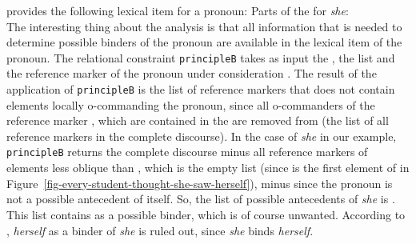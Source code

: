 \documentclass[output=paper
 	        ,biblatex
                ,babelshorthands
                ,newtxmath
                ,draftmode
                ,colorlinks, citecolor=brown
]{langscibook}
\begin{document}
\citet[]{Branco2002a} provides the following lexical item for a pronoun:
\eas
Parts of the \synsemv for \emph{she}:\\
\zs
The interesting thing about the analysis is that all information that is needed to determine
possible binders of the pronoun are available in the lexical item of the pronoun. The relational
constraint \texttt{principleB} takes as input the \listal {}, the \listu list  and the reference marker
of the pronoun under consideration . The result of the application of \texttt{principleB} is the list
of reference markers that does not contain elements locally o-commanding the pronoun, since all
o-commanders of the reference marker , which are contained in the \lista are removed from \listu (the
list of all reference markers in the complete discourse). In the case of \emph{she} in our example,
\texttt{principleB} returns the complete discourse  minus all reference markers of elements less oblique than , which is the empty
list (since  is the first element of  in
Figure~\ref{fig-every-student-thought-she-saw-herself}), minus  since the pronoun is not a
possible antecedent of itself. So, the list of possible antecedents of \emph{she} is . This list contains  as a possible binder, which
is of course unwanted. According to \citet[]{Branco2002a}, \emph{herself} as a binder of
\emph{she} is ruled out, since \emph{she} binds \emph{herself}.
\end{document}
